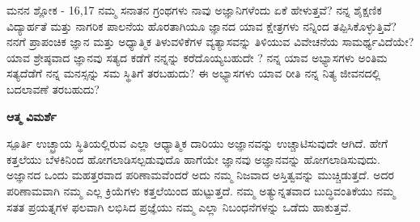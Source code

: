 \begin{mananam}{\mananamfont ಮನನ ಶ್ಲೋಕ - \textenglish{16,17}}
\footnotesize \mananamtext ನಮ್ಮ ಸನಾತನ ಗ್ರಂಥಗಳು ನಾವು ಅಜ್ಞಾನಿಗಳೆಂದು ಏಕೆ ಹೇಳುತ್ತವೆ? ನನ್ನ ಶೈಕ್ಷಣಿಕ ವಿದ್ಯಾರ್ಹತೆ ಮತ್ತು ನಾಗರಿಕ ಪಾಲನೆಯ ಹೊರತಾಗಿಯೂ ಜ್ಞಾನದ ಯಾವ ಕ್ಷೇತ್ರಗಳು ನನ್ನಿಂದ ತಪ್ಪಿಸಿಕೊಳ್ಳುತ್ತಿವೆ? ನನಗೆ ಪ್ರಾಪಂಚಿಕ ಜ್ಞಾನ ಮತ್ತು ಅಧ್ಯಾತ್ಮಿಕ ತಿಳುವಳಿಕೆಗಳ ವ್ಯತ್ಯಾಸವನ್ನು ತಿಳಿಯುವ ವಿವೇಚನೆಯ ಸಾಮರ್ಥ್ಯವಿದೆಯೇ? ಯಾವ ಶ್ರೇಷ್ಠವಾದ  ಜ್ಞಾನವು  ಸತ್ಯದ ಕಡೆಗೆ ನನ್ನನ್ನು ಕರೆದೊಯ್ಯಬಹುದೇ ? ನನ್ನ ಯಾವ ಅಭ್ಯಾಸಗಳು ಅಂತಿಮ ಸತ್ಯದೆಡೆಗೆ ನನ್ನ ಮನಸ್ಸನ್ನು ಸಮ ಸ್ಥಿತಿಗೆ ತರಬಹುದು? ಈ ಅಭ್ಯಾಸಗಳು ಯಾವ ರೀತಿ ನನ್ನ ನಿತ್ಯ ಜೀವನದಲ್ಲಿ ಬದಲಾವಣೆ ತರಬಹುದು?
\end{mananam}
\WritingHand\enspace\textbf{ಆತ್ಮ ವಿಮರ್ಶೆ}\\
\begin{inspiration}{\mananamfont ಸ್ಪೂರ್ತಿ}
\footnotesize \mananamtext ಉಚ್ಛ್ರಾಯ   ಸ್ಥಿತಿಯಲ್ಲಿರುವ ಎಲ್ಲಾ ಆಧ್ಯಾತ್ಮಿಕ ದಾರಿಯು ಅಜ್ಞಾನವನ್ನು ಉಚ್ಚಾಟಿಸುವುದೇ   ಆಗಿದೆ. ಹೇಗೆ ಕತ್ತಲೆಯು ಬೆಳಕಿನಿಂದ ಹೋಗಲಾಡಿಸಲ್ಪಡುವುದೊ   ಹಾಗೆಯೇ ಜ್ಞಾನವು ಅಜ್ಞಾನವನ್ನು ಹೋಗಲಾಡಿಸುವುದು. ಅಜ್ಞಾನದ ಒಂದು ಮಹತ್ತರವಾದ ಪರಿಣಾಮವೆಂದರೆ ಅದು ನಮ್ಮ ನಿಜವಾದ ಅಸ್ತಿತ್ವವನ್ನು ಮುಚ್ಚಿಡುತ್ತದೆ. ಅದರ ಪರಿಣಾಮವಾಗಿ ನಮ್ಮ ಎಲ್ಲ ಕ್ರಿಯೆಗಳು ಕತ್ತಲೆಯಿಂದ ಹುಟ್ಟುತ್ತದೆ. ನಮ್ಮ ಅತ್ಯುನ್ನತವಾದ ಬುದ್ಧಿವಂತಿಕೆಯು ನಮ್ಮ ಸತತ ಪ್ರಯತ್ನಗಳ ಫಲವಾಗಿ ಲಭಿಸಿದ ಪ್ರಜ್ಞೆಯು ನಮ್ಮ ಎಲ್ಲಾ ನಿಬಂಧನೆಗಳನ್ನು ಒಡೆದು ಹಾಕುತ್ತವೆ.
\end{inspiration}
\newpage

